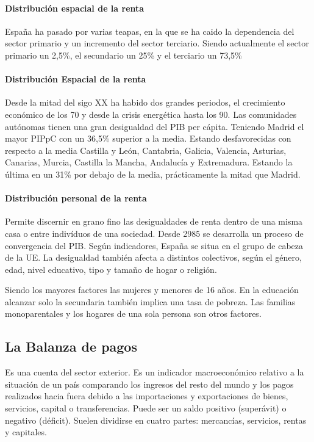         \paragraph{Distribución espacial de la renta}
            España ha pasado por varias teapas, en la que se ha caido la dependencia del sector primario y un incremento del sector terciario. Siendo actualmente el sector primario un 2,5\%, el secundario un 25\% y el terciario un 73,5\%
        
        \paragraph{Distribución Espacial de la renta}
            Desde la mitad del sigo XX ha habido dos grandes periodos, el crecimiento económico de los 70 y desde la crisis energética hasta los 90. Las comunidades autónomas tienen una gran desigualdad del PIB per cápita. Teniendo Madrid el mayor PIPpC con un 36,5\% superior a la media. Estando desfavorecidas con respecto a la media Castilla y León, Cantabria, Galicia, Valencia, Asturias, Canarias, Murcia, Castilla la Mancha, Andalucía y Extremadura. Estando la última en un 31\% por debajo de la media, prácticamente la mitad que Madrid.
        
        \paragraph{Distribución personal de la renta}
            Permite discernir en grano fino las desigualdades de renta dentro de una misma casa o entre indivíduos de una sociedad. Desde 2985  se desarrolla un proceso de convergencia del PIB. Según indicadores, España se situa en el grupo de cabeza de la UE. La desigualdad también afecta a distintos colectivos, según el género, edad, nivel educativo, tipo y tamaño de hogar o religión. 
            
            Siendo los mayores factores las mujeres y menores de 16 años. En la educación alcanzar solo la secundaria también implica una tasa de pobreza. Las familias monoparentales y los hogares de una sola persona son otros factores.

    \subsection{La Balanza de pagos}
        Es una cuenta del sector exterior. Es un indicador macroeconómico relativo a la situación de un país comparando los ingresos del resto del mundo y los pagos realizados hacia fuera debido a las importaciones y exportaciones de bienes, servicios, capital o transferencias. Puede ser un saldo positivo (superávit) o negativo (déficit). Suelen dividirse en cuatro partes: mercancías, servicios, rentas y capitales.

